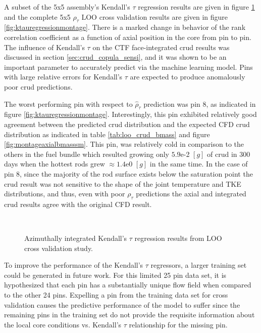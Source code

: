 A subset of the 5x5 assembly's Kendall's $\tau$ regression results are given in figure \ref{fig:ktauregression} and the complete 5x5 $\rho_\tau$ LOO cross validation results are given in figure \ref{fig:ktauregressionmontage}.  There is a marked change in behavior of the rank correlation coefficient as a function of axial position in the core from pin to pin.  The influence of Kendall's $\tau$ on the CTF face-integrated crud results was discussed in section \ref{sec:crud_copula_sensi}, and it was shown to be an important parameter to accurately predict via the machine learning model.  Pins with large relative errors for Kendall's $\tau$ are expected to produce anomalously poor crud predictions.

The worst performing pin with respect to $\hat \rho_\tau$ prediction was pin 8, as indicated in figure \ref{fig:ktauregressionmontage}.  Interestingly, this pin exhibited relatively good agreement between the predicted crud distribution and the expected CFD crud distribution as indicated in table \ref{tab:loo_crud_bmass} and figure \ref{fig:montageaxialbmasssm}.  This pin, was relatively cold in comparison to the others in the fuel bundle which resulted growing only $5.9$e-2 $[g]$ of crud in 300 days when the hottest rods grew $\approx 1.4$e0 $[g]$ in the same time.  In the case of pin 8, since the majority of the rod surface exists below the saturation point the crud result was not sensitive to the shape of the joint temperature and TKE distributions, and thus, even with poor $\rho_\tau$ predictions the axial and integrated crud results agree with the original CFD result.

\begin{figure}[H]%
    \centering
    \hspace*{-1.0em}%
    \hspace*{-1.0em}%
    \\
    \hspace*{-1.0em}%
    \hspace*{-1.0em}%
    \caption[Kendall's $\tau$ regression LOO results.]{Azimuthally integrated Kendall's $\tau$ regression results from LOO cross validation study.}%
    \label{fig:ktauregression}%
\end{figure}
To improve the performance of the Kendall's $\tau$ regressors, a larger training set could be generated in future work.  For this limited 25 pin data set, it is hypothesized that each pin has a substantially unique flow field when compared to the other 24 pins.  Expelling a pin from the training data set for cross validation causes the predictive performance of the model to suffer since the remaining pins in the training set do not provide the requisite information about the local core conditions vs. Kendall's $\tau$ relationship for the missing pin.


